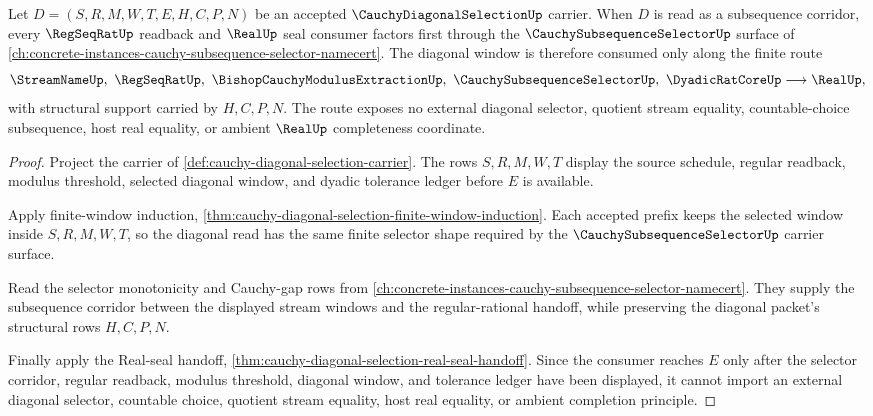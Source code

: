\begin{theorem}
\label{thm:cauchy-diagonal-selection-to-subsequence-route}
Let $D=(S,R,M,W,T,E,H,C,P,N)$ be an accepted $\CauchyDiagonalSelectionUp$ carrier. When $D$ is read as a subsequence corridor, every $\RegSeqRatUp$ readback and $\RealUp$ seal consumer factors first through the $\CauchySubsequenceSelectorUp$ surface of \autoref{ch:concrete-instances-cauchy-subsequence-selector-namecert}. The diagonal window is therefore consumed only along the finite route
$$
\StreamNameUp,\ \RegSeqRatUp,\ \BishopCauchyModulusExtractionUp,\ \CauchySubsequenceSelectorUp,\ \DyadicRatCoreUp \longrightarrow \RealUp ,
$$
with structural support carried by $H,C,P,N$. The route exposes no external diagonal selector, quotient stream equality, countable-choice subsequence, host real equality, or ambient $\RealUp$ completeness coordinate.
\end{theorem}
\begin{proof}
Project the carrier of \autoref{def:cauchy-diagonal-selection-carrier}. The rows $S,R,M,W,T$ display the source schedule, regular readback, modulus threshold, selected diagonal window, and dyadic tolerance ledger before $E$ is available.

Apply finite-window induction, \autoref{thm:cauchy-diagonal-selection-finite-window-induction}. Each accepted prefix keeps the selected window inside $S,R,M,W,T$, so the diagonal read has the same finite selector shape required by the $\CauchySubsequenceSelectorUp$ carrier surface.

Read the selector monotonicity and Cauchy-gap rows from \autoref{ch:concrete-instances-cauchy-subsequence-selector-namecert}. They supply the subsequence corridor between the displayed stream windows and the regular-rational handoff, while preserving the diagonal packet's structural rows $H,C,P,N$.

Finally apply the Real-seal handoff, \autoref{thm:cauchy-diagonal-selection-real-seal-handoff}. Since the consumer reaches $E$ only after the selector corridor, regular readback, modulus threshold, diagonal window, and tolerance ledger have been displayed, it cannot import an external diagonal selector, countable choice, quotient stream equality, host real equality, or ambient completion principle.
\end{proof}


